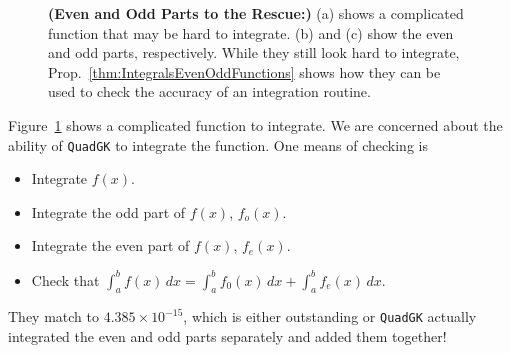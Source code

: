 \begin{figure}[htb]%
\centering
\hfill{}%
\hfill{}%
\hfill{}%
    \caption[]{
    \textbf{(Even and Odd Parts to the Rescue:)} (a) shows a  complicated function that may be hard to integrate. (b) and (c) show the even and odd parts, respectively. While they still look hard to integrate, Prop.~\ref{thm:IntegralsEvenOddFunctions} shows how they can be used to check the accuracy of an integration routine.
    }
    \label{fig:UtilityEvenOddFunctions}
\end{figure}

\begin{example} Figure~\ref{fig:UtilityEvenOddFunctions} shows a complicated function to integrate. We are concerned about the ability of \texttt{QuadGK} to integrate the function. One means of checking is
\begin{itemize}
    \item Integrate $f(x)$.
    \item Integrate the odd part of $f(x)$, $f_o(x)$.
    \item Integrate the even part of $f(x)$, $f_e(x)$.
    \item Check that $\int_a^b f(x) \, dx = \int_a^b f_0(x) \, dx + \int_a^b f_e(x) \, dx$.
\end{itemize}   

They match to $4.385 \times 10^{-15}$, which is either outstanding or \texttt{QuadGK} actually integrated the even and odd parts separately and added them together!

\end{example}

